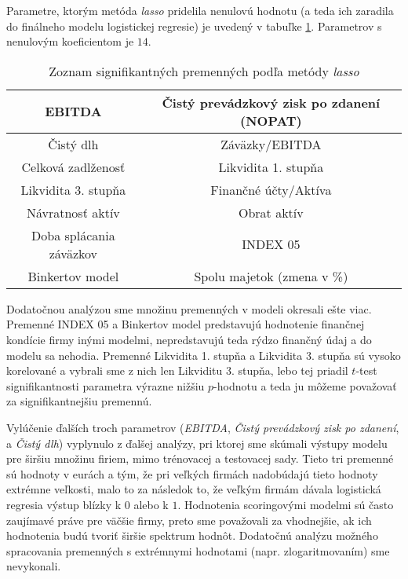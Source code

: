 Parametre, ktorým metóda \emph{lasso} pridelila nenulovú hodnotu (a teda ich zaradila do finálneho modelu logistickej regresie) je uvedený v tabuľke \ref{lasso tabulka vsetky parametre}.
Parametrov s nenulovým koeficientom je \(14\).

\begin{table}
    \begin{tabular}{ |c|c| }
        \hline
        EBITDA & Čistý prevádzkový zisk po zdanení (NOPAT) \\
        \hline
        Čistý dlh & Záväzky/EBITDA \\
        \hline
        Celková zadlženosť & Likvidita 1. stupňa\\
        \hline
        Likvidita 3. stupňa & Finančné účty/Aktíva \\
        \hline
        Návratnosť aktív & Obrat aktív \\
        \hline
        Doba splácania záväzkov & INDEX 05 \\
        \hline
        Binkertov model & Spolu majetok (zmena v \%) \\
        \hline
    \end{tabular}
    \caption{Zoznam signifikantných premenných podľa metódy \emph{lasso}}
    \label{lasso tabulka vsetky parametre}
\end{table}

Dodatočnou analýzou sme množinu premenných v modeli okresali ešte viac.
Premenné INDEX 05 a Binkertov model predstavujú hodnotenie finančnej kondície firmy inými modelmi, nepredstavujú teda rýdzo finančný údaj a do modelu sa nehodia.
Premenné Likvidita 1. stupňa a Likvidita 3. stupňa sú vysoko korelované a vybrali sme z nich len Likviditu 3. stupňa,
lebo tej priadil \(t\)-test signifikantnosti parametra výrazne nižšiu \(p\)-hodnotu a teda ju môžeme považovať za signifikantnejšiu premennú.

Vylúčenie ďalších troch parametrov (\emph{EBITDA}, \emph{Čistý prevádzkový zisk po zdanení}, a \emph{Čistý dlh}) vyplynulo z ďalšej analýzy,
pri ktorej sme skúmali výstupy modelu pre širšiu množinu firiem, mimo trénovacej a testovacej sady.
Tieto tri premenné sú hodnoty v eurách a tým, že pri veľkých firmách nadobúdajú tieto hodnoty extrémne veľkosti,
malo to za následok to, že veľkým firmám dávala logistická regresia výstup blízky k \(0\) alebo k \(1\).
Hodnotenia scoringovými modelmi sú často zaujímavé práve pre väčšie firmy, preto sme považovali za vhodnejšie, ak ich hodnotenia budú tvoriť širšie spektrum hodnôt.
Dodatočnú analýzu možného spracovania premenných s extrémnymi hodnotami (napr. zlogaritmovaním) sme nevykonali.

